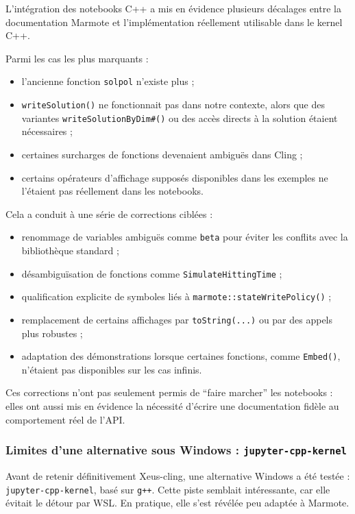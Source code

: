 \documentclass[a4paper,12pt,twoside]{article}
\begin{document}
L'intégration des notebooks C++ a mis en évidence plusieurs décalages entre la documentation Marmote et l'implémentation réellement utilisable dans le kernel C++.

Parmi les cas les plus marquants :
\begin{itemize}
    \item l'ancienne fonction \texttt{solpol} n'existe plus ;
    \item \texttt{writeSolution()} ne fonctionnait pas dans notre contexte, alors que des variantes \texttt{writeSolutionByDim\#()} ou des accès directs à la solution étaient nécessaires ;
    \item certaines surcharges de fonctions devenaient ambiguës dans Cling ;
    \item certains opérateurs d'affichage supposés disponibles dans les exemples ne l'étaient pas réellement dans les notebooks.
\end{itemize}

Cela a conduit à une série de corrections ciblées :
\begin{itemize}
    \item renommage de variables ambiguës comme \texttt{beta} pour éviter les conflits avec la bibliothèque standard ;
    \item désambiguïsation de fonctions comme \texttt{SimulateHittingTime} ;
    \item qualification explicite de symboles liés à \texttt{marmote::stateWritePolicy()} ;
    \item remplacement de certains affichages par \texttt{toString(...)} ou par des appels plus robustes ;
    \item adaptation des démonstrations lorsque certaines fonctions, comme \texttt{Embed()}, n'étaient pas disponibles sur les cas infinis.
\end{itemize}

Ces corrections n'ont pas seulement permis de ``faire marcher'' les notebooks : elles ont aussi mis en évidence la nécessité d'écrire une documentation fidèle au comportement réel de l'API.

\subsubsection{Limites d'une alternative sous Windows : \texttt{jupyter-cpp-kernel}}

Avant de retenir définitivement Xeus-cling, une alternative Windows a été testée : \texttt{jupyter-cpp-kernel}, basé sur \texttt{g++}. Cette piste semblait intéressante, car elle évitait le détour par WSL. En pratique, elle s'est révélée peu adaptée à Marmote.
\end{document}
